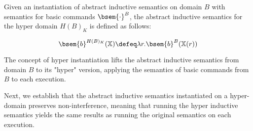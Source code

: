 \begin{definition}
  Given an instantiation of abstract inductive semantics on domain $B$ with
  semantics for basic commands $\bsem{\cdot}^B$, the abstract inductive
  semantics for the hyper domain $H(B)_K$ is defined as follows:

  $$\bsem{b}^{H(B)_K}(\chi) \defeq \lambda r . \bsem{b}^B(\chi(r))$$
\end{definition}

The concept of hyper instantiation lifts the abstract inductive semantics from
domain $B$ to its "hyper" version, applying the semantics of basic commands
from $B$ to each execution.

Next, we establish that the abstract inductive semantics instantiated on a
hyper-domain preserves non-interference, meaning that running the hyper
inductive semantics yields the same results as running the original semantics
on each execution.

